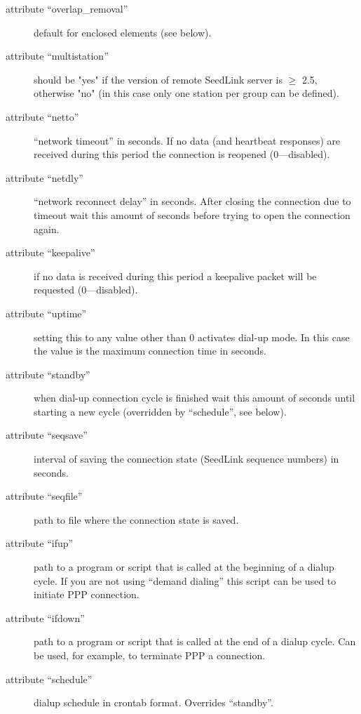 \documentclass[11pt,a4paper,titlepage]{article}
\begin{document}
\begin{description}
\begin{description}
\begin{description}
\item[attribute ``overlap\_removal''] default for enclosed elements (see
below).

\item[attribute ``multistation''] should be "yes" if the version of remote
SeedLink server is $\ge$ 2.5, otherwise "no" (in this case only one station
per group can be defined).

\item[attribute ``netto''] ``network timeout'' in seconds. If no data (and
heartbeat responses) are received during this period the connection is
reopened (0---disabled).

\item[attribute ``netdly''] ``network reconnect delay'' in seconds. After
closing the connection due to timeout wait this amount of seconds before
trying to open the connection again.

\item[attribute ``keepalive''] if no data is received during this period
a keepalive packet will be requested (0---disabled).

\item[attribute ``uptime'' ] setting this to any value other than 0
activates dial-up mode. In this case the value is the maximum connection
time in seconds.

\item[attribute ``standby''] when dial-up connection cycle is finished
wait this amount of seconds until starting a new cycle (overridden by
``schedule'', see below).

\item[attribute ``seqsave''] interval of saving the connection state
(SeedLink sequence numbers) in seconds.

\item[attribute ``seqfile''] path to file where the connection state is
saved.

\item[attribute ``ifup''] path to a program or script that is called at the
beginning of a dialup cycle. If you are not using ``demand dialing''
this script can be used to initiate PPP connection.

\item[attribute ``ifdown''] path to a program or script that is called
at the end of a dialup cycle. Can be used, for example, to terminate
PPP a connection.

\item[attribute ``schedule''] dialup schedule in crontab format. Overrides
``standby''.


\end{description}
\end{description}
\end{description}
\end{document}
